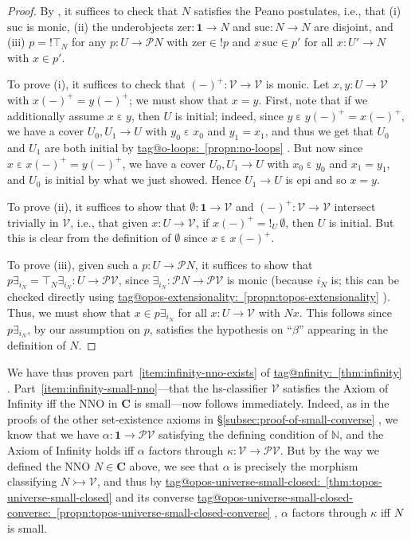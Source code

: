 \documentclass{amsart}
\makeatletter
\newcommand\bC{\mathbf{C}}
\newcommand\cV{\mathcal{V}}
\newcommand\ein{\mathrel{\varepsilon}}
\newcommand\N{\mathbb{N}}
\newcommand\pow{\mathcal{P}}
\newcommand\suc{\mathrm{suc}}
\newcommand\tm{\mathbf{1}}
\newcommand\tto{\rightarrowtail}
\newcommand\unex{{!}}
\newcommand\zer{\mathrm{zer}}
\newcommand\tagword[1]{\csname tag@#1\endcsname}
\def\label@tag#1:#2\@nil{#1}
\newcommand\labeltag[1]{\label@tag#1:\@nil}
\newcommand\jref[1]{%
  \texorpdfstring%
    {\hyperref[#1]{\tagword{\labeltag{#1}}~\ref*{#1}}}%
    {\tagword{\labeltag{#1}}~\ref*{#1}}%
}
\newcommand\prerefpost[3]{%
  \texorpdfstring%
    {\hyperref[#2]{#1\ref*{#2}#3}}%
    {#1\ref*{#2}#3}%
}
\newcommand\sref[1]{\prerefpost{\S}{#1}{}}
\theoremstyle{definition}
\theoremstyle{remark}
\theoremstyle{plainwithref}
\makeatother
\begin{document}
\begin{proof}
  By \cite[\S D5.1]{johnstone-elephant-vols}, it suffices to check that \( N \) satisfies the Peano postulates, i.e., that (i) \( \suc \) is monic, (ii) the underobjects \( \zer \colon \tm \to N \) and \( \suc \colon N \to N \) are disjoint, and (iii) \( p = \unex \top_N \) for any \( p \colon U \to \pow N \) with \( \zer \in \unex p \) and \( x\,\suc \in p' \) for all \( x \colon U' \to N \) with \( x \in p' \).

  To prove (i), it suffices to check that \( (-)^+ \colon \cV \to \cV \) is monic.
  Let \( x,y \colon U \to \cV \) with \( x (-)^+ = y (-)^+ \); we must show that \( x = y \).
  First, note that if we additionally assume \( x \ein y \), then \( U \) is initial; indeed, since \( y \ein y (-)^+ = x (-)^+ \), we have a cover \( U_0,U_1 \to U \) with \( y_0 \ein x_0 \) and \( y_1 = x_1 \), and thus we get that \( U_0 \) and \( U_1 \) are both initial by \jref{propn:no-loops}.
  But now since \( x \ein x (-)^+ = y (-)^+ \), we have a cover \( U_0,U_1 \to U \) with \( x_0 \ein y_0 \) and \( x_1 = y_1 \), and \( U_0 \) is initial by what we just showed.
  Hence \( U_1 \to U \) is epi and so \( x = y \).

  To prove (ii), it suffices to show that \( \emptyset \colon \tm \to \cV \) and \( (-)^+ \colon \cV \to \cV \) intersect trivially in \( \cV \), i.e., that given \( x \colon U \to \cV \), if \( x (-)^+ = \unex_U\, \emptyset \), then \( U \) is initial.
  But this is clear from the definition of \( \emptyset \) since \( x \ein x (-)^+ \).

  To prove (iii), given such a \( p \colon U \to \pow N \), it suffices to show that \( p \exists_{i_N} = \top_N \exists_{i_N} \colon U \to \pow \cV \), since \( \exists_{i_N} \colon \pow N \to \pow \cV \) is monic (because \( i_N \) is; this can be checked directly using \jref{propn:topos-extensionality}).
  Thus, we must show that \( x \in p \exists_{i_N} \) for all \( x \colon U \to \cV \) with \( N x \).
  This follows since \( p \exists_{i_N} \), by our assumption on \( p \), satisfies the hypothesis on ``\( \beta \)'' appearing in the definition of \( N \).
\end{proof}

We have thus proven part~\ref{item:infinity-nno-exists} of \jref{thm:infinity}.
Part~\ref{item:infinity-small-nno}---that the hs-classifier \( \cV \) satisfies the Axiom of Infinity iff the NNO in \( \bC \) is small---now follows immediately.
Indeed, as in the proofs of the other set-existence axioms in \sref{subsec:proof-of-small-converse}, we know that we have \( \alpha \colon \tm \to \pow \cV \) satisfying the defining condition of \( \N \), and the Axiom of Infinity holds iff \( \alpha \) factors through \( \kappa \colon \cV \to \pow \cV \).
But by the way we defined the NNO \( N \in \bC \) above, we see that \( \alpha \) is precisely the morphism classifying \( N \tto \cV \), and thus by \jref{thm:topos-universe-small-closed} and its converse \jref{propn:topos-universe-small-closed-converse}, \( \alpha \) factors through \( \kappa \) iff \( N \) is small.
\end{document}
